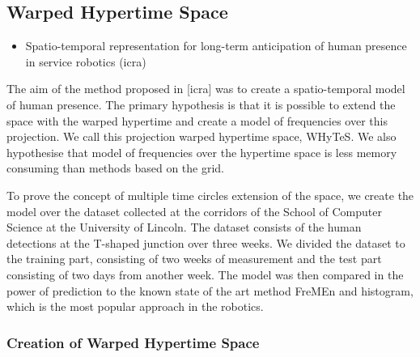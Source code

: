 \subsection{Warped Hypertime Space}

\begin{itemize}
    \item Spatio-temporal representation for long-term anticipation of human presence in service robotics (icra)
\end{itemize}

The aim of the method proposed in [icra] was to create a spatio-temporal model of human presence. 
The primary hypothesis is that it is possible to extend the space with the warped hypertime and create a model of frequencies over this projection.
We call this projection warped hypertime space, WHyTeS. 
We also hypothesise that model of frequencies over the hypertime space is less memory consuming than methods based on the grid.

To prove the concept of multiple time circles extension of the space, we create the model over the dataset collected at the corridors of the School of Computer Science at the University of Lincoln.
The dataset consists of the human detections at the T-shaped junction over three weeks.
We divided the dataset to the training part, consisting of two weeks of measurement and the test part consisting of two days from another week.
The model was then compared in the power of prediction to the known state of the art method FreMEn and histogram, which is the most popular approach in the robotics.

\subsubsection{Creation of Warped Hypertime Space}\label{sec:whytes}

